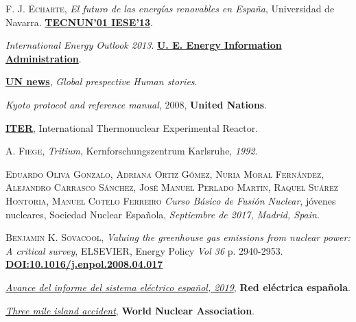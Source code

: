 \begin{thebibliography}{100}
 \textsc{F. J. Echarte},
\textit{El futuro de las energías renovables en España}, Universidad de Navarra. \href{https://tecnun.unav.edu/alumni/compartiendo-experiencia/futuro-energias-renovables}{\textbf{TECNUN'01 IESE'13}}.

\textit{International Energy Outlook 2013}. \href{https://www.eia.gov/outlooks/ieo/}{\textbf{U. E. Energy Information Administration}}.

\href{https://news.un.org/en/story/2019/11/1052111}{\textbf{UN news}}, \textit{Global prespective Human stories}.

\textit{Kyoto protocol and reference manual}, 2008, \textbf{United Nations}.

\href{https://www.iter.org/}{\textbf{ITER}}, International Thermonuclear Experimental Reactor.

 \textsc{A. Fiege}, 
\textit{Tritium}, Kernforschungszentrum Karlsruhe, \textit{1992}.

 \textsc{Eduardo Oliva Gonzalo}, \textsc{Adriana Ortiz Gómez}, \textsc{Nuria Moral Fernández}, \textsc{Alejandro Carrasco Sánchez}, \textsc{José Manuel Perlado Martín}, \textsc{Raquel Suárez Hontoria}, \textsc{Manuel Cotelo Ferreiro} 
\textit{Curso Básico de Fusión Nuclear}, jóvenes nucleares, Sociedad Nuclear Española, \textit{Septiembre de 2017, Madrid, Spain}.

 \textsc{Benjamin K. Sovacool},
\textit{Valuing the greenhouse gas emissions from nuclear power: A critical survey}, ELSEVIER, Energy Policy  \textit{Vol 36} p. 2940-2953. \href{https://www.academia.edu/2639807/Valuing_the_greenhouse_gas_emissions_from_nuclear_power_A_critical_survey}{\textbf{DOI:10.1016/j.enpol.2008.04.017}}

\href{https://www.ree.es/es/datos/publicaciones/informe-anual-sistema/informe-del-sistema-electrico-espanol-2019}{\textit{Avance del informe del sistema eléctrico español, 2019}}, 
\textbf{Red eléctrica española}.

\href{www.world-nuclear.org/information-library/safety-and-security/safety-of-plants/three-mile-island-accident.aspx}{\textit{Three mile island accident}}, \textbf{World Nuclear Association}.


\end{thebibliography}
